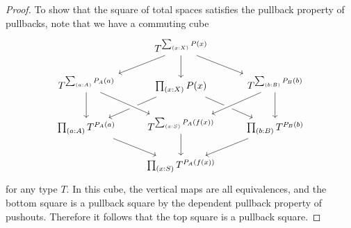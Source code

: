 \begin{proof}
  To show that the square of total spaces satisfies the pullback property of pullbacks, note that we have a commuting cube
  \begin{equation*}
    \begin{tikzcd}
      & T^{\sm{x:X}P(x)} \arrow[dl] \arrow[d] \arrow[dr] \\
      T^{\sm{a:A}P_A(a)} \arrow[d] & \prd{x:X}P(x) \arrow[dl] \arrow[dr] & T^{\sm{b:B}P_B(b)} \arrow[dl,crossing over] \arrow[d] \\
      \prd{a:A}T^{P_A(a)} \arrow[dr] & T^{\sm{x:S}P_A(f(x))} \arrow[from=ul,crossing over] \arrow[d] & \prd{b:B}T^{P_B(b)} \arrow[dl] \\
      & \prd{x:S}T^{P_A(f(x))}
    \end{tikzcd}
  \end{equation*}
  for any type $T$. In this cube, the vertical maps are all equivalences, and the bottom square is a pullback square by the dependent pullback property of pushouts. Therefore it follows that the top square is a pullback square.
\end{proof}

